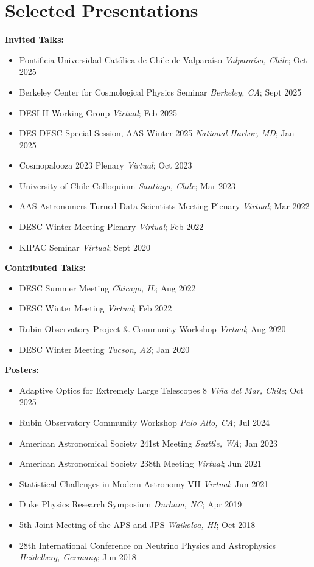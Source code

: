 \section{Selected Presentations}

\textbf{Invited Talks:}
\begin{itemize}
    \item Pontificia Universidad Católica de Chile de Valparaíso \hfill \textit{Valpara\'iso, Chile}; Oct 2025 
    \item Berkeley Center for Cosmological Physics Seminar \hfill \textit{Berkeley, CA}; Sept 2025
    \item DESI-II Working Group \hfill \textit{Virtual}; Feb 2025
    \item DES-DESC Special Session, AAS Winter 2025 \hfill \textit{National Harbor, MD}; Jan 2025
    \item Cosmopalooza 2023 Plenary \hfill \textit{Virtual}; Oct 2023    
    \item University of Chile Colloquium \hfill \textit{Santiago, Chile}; Mar 2023
    \item AAS Astronomers Turned Data Scientists Meeting Plenary \hfill \textit{Virtual}; Mar 2022
    \item DESC Winter Meeting Plenary \hfill \textit{Virtual}; Feb 2022
    \item KIPAC Seminar \hfill \textit{Virtual}; Sept 2020
\end{itemize}

\textbf{Contributed Talks:}
\begin{itemize}
    \item DESC Summer Meeting \hfill \textit{Chicago, IL}; Aug 2022
    \item DESC Winter Meeting \hfill \textit{Virtual}; Feb 2022
    \item Rubin Observatory Project \& Community Workshop \hfill \textit{Virtual}; Aug 2020
    \item DESC Winter Meeting \hfill \textit{Tucson, AZ}; Jan 2020
\end{itemize}

\textbf{Posters:}
\begin{itemize}
    \item Adaptive Optics for Extremely Large Telescopes 8 \hfill \textit{Vi\~{n}a del Mar, Chile}; Oct 2025
    \item Rubin Observatory Community Workshop \hfill \textit{Palo Alto, CA}; Jul 2024
    \item American Astronomical Society 241st Meeting \hfill \textit{Seattle, WA}; Jan 2023
    \item American Astronomical Society 238th Meeting \hfill \textit{Virtual}; Jun 2021
    \item Statistical Challenges in Modern Astronomy VII \hfill \textit{Virtual}; Jun 2021
    \item Duke Physics Research Symposium \hfill \textit{Durham, NC}; Apr 2019
    \item 5th Joint Meeting of the APS and JPS \hfill \textit{Waikoloa, HI}; Oct 2018
    \item 28th International Conference on Neutrino Physics and Astrophysics \hfill \textit{Heidelberg, Germany}; Jun 2018
\end{itemize}